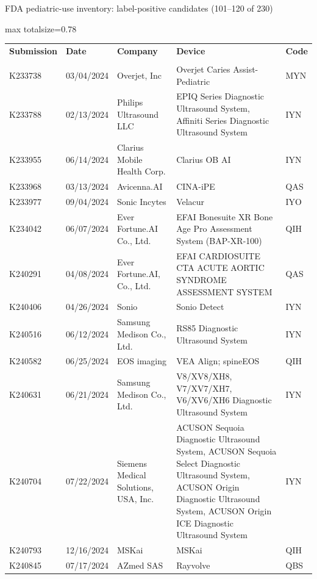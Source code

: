 \documentclass[aspectratio=169]{beamer}
\renewcommand{\arraystretch}{1.08}
\begin{document}
\begin{frame}[category=FDA appendix]{FDA pediatric-use inventory: label-positive candidates (101--120 of 230)}
\begin{adjustbox}{max totalsize={\textwidth}{0.78\textheight}}
\renewcommand{\arraystretch}{1.2}
\begin{tabular}{|p{}|p{}|p{}|p{}|p{}|}
\hline \textbf{Submission} & \textbf{Date} & \textbf{Company} & \textbf{Device} & \textbf{Code} \\\\ \hline
K233738 & 03/04/2024 & Overjet, Inc & Overjet Caries Assist-Pediatric & MYN \\ \hline
K233788 & 02/13/2024 & Philips Ultrasound LLC & EPIQ Series Diagnostic Ultrasound System, Affiniti Series Diagnostic Ultrasound System & IYN \\ \hline
K233955 & 06/14/2024 & Clarius Mobile Health Corp. & Clarius OB AI & IYN \\ \hline
K233968 & 03/13/2024 & Avicenna.AI & CINA-iPE & QAS \\ \hline
K233977 & 09/04/2024 & Sonic Incytes & Velacur & IYO \\ \hline
K234042 & 06/07/2024 & Ever Fortune.AI Co., Ltd. & EFAI Bonesuite XR Bone Age Pro Assessment System (BAP-XR-100) & QIH \\ \hline
K240291 & 04/08/2024 & Ever Fortune.AI, Co., Ltd. & EFAI CARDIOSUITE CTA ACUTE AORTIC SYNDROME ASSESSMENT SYSTEM & QAS \\ \hline
K240406 & 04/26/2024 & Sonio & Sonio Detect & IYN \\ \hline
K240516 & 06/12/2024 & Samsung Medison Co., Ltd. & RS85 Diagnostic Ultrasound System & IYN \\ \hline
K240582 & 06/25/2024 & EOS imaging & VEA Align; spineEOS & QIH \\ \hline
K240631 & 06/21/2024 & Samsung Medison Co., Ltd. & V8/XV8/XH8, V7/XV7/XH7, V6/XV6/XH6 Diagnostic Ultrasound System & IYN \\ \hline
K240704 & 07/22/2024 & Siemens Medical Solutions, USA, Inc. & ACUSON Sequoia Diagnostic Ultrasound System, ACUSON Sequoia Select Diagnostic Ultrasound System, ACUSON Origin Diagnostic Ultrasound System, ACUSON Origin ICE  Diagnostic Ultrasound System & IYN \\ \hline
K240793 & 12/16/2024 & MSKai & MSKai & QIH \\ \hline
K240845 & 07/17/2024 & AZmed SAS & Rayvolve & QBS \\ \hline

\end{tabular}
\end{adjustbox}
\end{frame}
\end{document}
